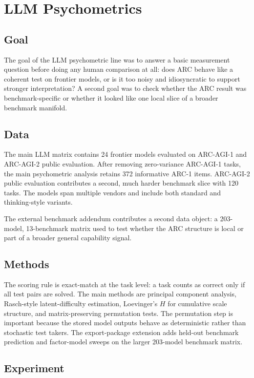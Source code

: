 \section{LLM Psychometrics}

\subsection{Goal}

The goal of the LLM psychometric line was to answer a basic measurement question before doing any human comparison at all: does ARC behave like a coherent test on frontier models, or is it too noisy and idiosyncratic to support stronger interpretation? A second goal was to check whether the ARC result was benchmark-specific or whether it looked like one local slice of a broader benchmark manifold.

\subsection{Data}

The main LLM matrix contains 24 frontier models evaluated on ARC-AGI-1 and ARC-AGI-2 public evaluation. After removing zero-variance ARC-AGI-1 tasks, the main psychometric analysis retains 372 informative ARC-1 items. ARC-AGI-2 public evaluation contributes a second, much harder benchmark slice with 120 tasks. The models span multiple vendors and include both standard and thinking-style variants.

The external benchmark addendum contributes a second data object: a 203-model, 13-benchmark matrix used to test whether the ARC structure is local or part of a broader general capability signal.

\subsection{Methods}

The scoring rule is exact-match at the task level: a task counts as correct only if all test pairs are solved. The main methods are principal component analysis, Rasch-style latent-difficulty estimation, Loevinger's $H$ for cumulative scale structure, and matrix-preserving permutation tests. The permutation step is important because the stored model outputs behave as deterministic rather than stochastic test takers. The export-package extension adds held-out benchmark prediction and factor-model sweeps on the larger 203-model benchmark matrix.

\subsection{Experiment}

